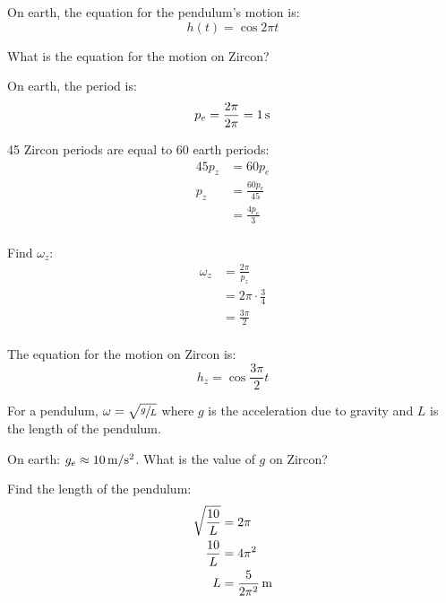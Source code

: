 \documentclass[fleqn,addpoints]{exam}
\begin{document}
\begin{questions}
      On earth, the equation for the pendulum's motion is:
      \[
        h(t) = \cos 2 \pi t
      \]

      \begin{parts}
          
        \bonuspart[8]
          What is the equation for the motion on Zircon?

          \begin{solution}
            On earth, the period is:
            \[
              p_e = \frac{2 \pi}{2 \pi} = \unit[1]{s}
            \]

            45 Zircon periods are equal to 60 earth periods:
            \begin{align*}
              45 p_z & = 60 p_e \\
              p_z    & = \frac{ 60 p_e }{45} \\
                     & = \frac{ 4 p_e }{3} \\
            \end{align*}

            Find $\omega_z$:
            \begin{align*}
              \omega_z & = \frac{2 \pi}{p_z} \\
                       & = 2 \pi \cdot \frac{3}{4} \\
                       & = \frac{3 \pi}{2} \\
            \end{align*}

            The equation for the motion on Zircon is:
            \[
              h_z = \cos \frac{3 \pi}{2} t
            \]

          \end{solution}

        \bonuspart[4]
          For a pendulum, $\omega = \sqrt{ \sfrac{g}{L}}$ where $g$ is the acceleration due to gravity and
          $L$ is the length of the pendulum.

          On earth: $g_e \approx \unit[10]{m/s^2}$.  What is the value of $g$ on Zircon?

          \begin{solution}
            Find the length of the pendulum:
            \begin{align*}
              \sqrt{ \frac{10}{L} } & = 2 \pi \\
              \frac{10}{L}          & = 4 \pi^2 \\
              L                     & = \unit[\frac{5}{2 \pi^2}]{m} \\
            \end{align*}


\end{solution}
\end{parts}
\end{questions}
\end{document}
